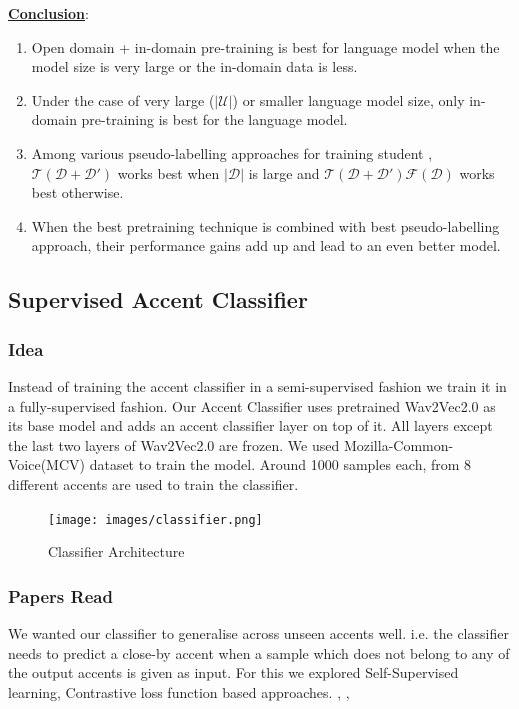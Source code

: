 \documentclass[12pt, a4paper, twoside]{article}
\begin{document}
\begin{itemize}
    \underline{\textbf{Conclusion}}:
    \begin{enumerate}
        \item Open domain + in-domain pre-training is best for language model when the model size is very large or the in-domain data is less. 
        \item Under the case of very large ($|\mathcal{U}|$) or smaller language model size, only in-domain pre-training is best for the language model.
        \item Among various pseudo-labelling approaches for training student , $\mathcal{T}(\mathcal{D} + \mathcal{D'})$ works best when $|\mathcal{D}|$ is large and $\mathcal{T}(\mathcal{D} + \mathcal{D'}) \mathcal{F}(\mathcal{D})$ works best otherwise.
        \item When the best pretraining technique is combined with best pseudo-labelling approach, their performance gains add up and lead to an even better model.
    \end{enumerate}
\end{itemize}
\subsection{Supervised Accent Classifier}
\subsubsection{Idea}
Instead of training the accent classifier in a semi-supervised fashion we train it in a fully-supervised fashion. Our Accent Classifier uses pretrained Wav2Vec2.0 as its base model and adds an accent classifier layer on top of it. All layers except the last two layers of Wav2Vec2.0 are frozen. We used Mozilla-Common-Voice(MCV) dataset to train the model. Around 1000 samples each, from 8 different accents are used to train the classifier. 
\vspace{-10pt}
\begin{figure}[h]
    \centering
    \texttt{[image: images/classifier.png]}
    \caption{Classifier Architecture \protect \footnotemark}
    \label{fig:classifier w2v2}
\end{figure}
\vspace{-10pt}
\subsubsection{Papers Read}
We wanted our classifier to generalise across unseen accents well. i.e. the classifier needs to predict a close-by accent when a sample which does not belong to any of the output accents is given as input. For this we explored Self-Supervised learning, Contrastive loss function based approaches. \cite{han2021supervised}, \cite{deng2021improving}, \cite{jain2018improved}
\end{document}
